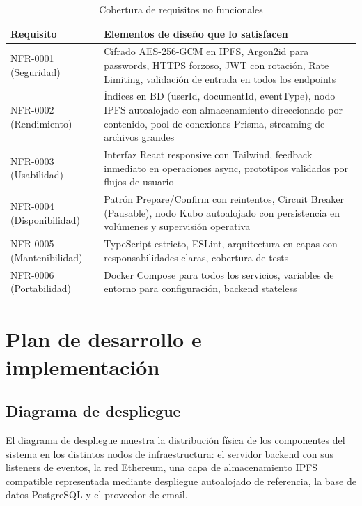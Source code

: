 \documentclass[11pt, a4paper]{article}
\begin{document}
\begin{table}[H]
\centering
\small
\begin{tabular}{|p{2.5cm}|p{11cm}|}
\hline
\textbf{Requisito} & \textbf{Elementos de diseño que lo satisfacen} \\
\hline
\hline
NFR-0001 (Seguridad) & Cifrado AES-256-GCM en IPFS, Argon2id para passwords, HTTPS forzoso, JWT con rotación, Rate Limiting, validación de entrada en todos los endpoints \\
\hline
NFR-0002 (Rendimiento) & Índices en BD (userId, documentId, eventType), nodo IPFS autoalojado con almacenamiento direccionado por contenido, pool de conexiones Prisma, streaming de archivos grandes \\
\hline
NFR-0003 (Usabilidad) & Interfaz React responsive con Tailwind, feedback inmediato en operaciones async, prototipos validados por flujos de usuario \\
\hline
NFR-0004 (Disponibilidad) & Patrón Prepare/Confirm con reintentos, Circuit Breaker (Pausable), nodo Kubo autoalojado con persistencia en volúmenes y supervisión operativa \\
\hline
NFR-0005 (Mantenibilidad) & TypeScript estricto, ESLint, arquitectura en capas con responsabilidades claras, cobertura de tests \\
\hline
NFR-0006 (Portabilidad) & Docker Compose para todos los servicios, variables de entorno para configuración, backend stateless \\
\hline
\end{tabular}
\caption{Cobertura de requisitos no funcionales}
\label{tab:cross-nfr}
\end{table}

\section{Plan de desarrollo e implementación}

\subsection{Diagrama de despliegue}

El diagrama de despliegue muestra la distribución física de los componentes del sistema en los distintos nodos de infraestructura: el servidor backend con sus listeners de eventos, la red Ethereum, una capa de almacenamiento IPFS compatible representada mediante despliegue autoalojado de referencia, la base de datos PostgreSQL y el proveedor de email.
\end{document}
